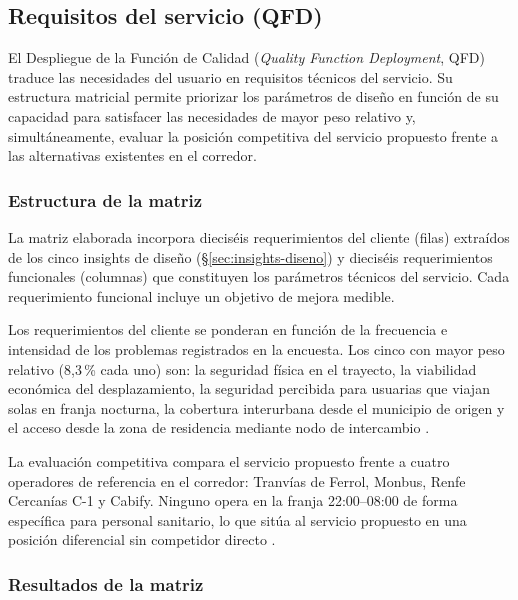 \subsection{Requisitos del servicio (QFD)}\label{sec:qfd}

El Despliegue de la Función de Calidad (\textit{Quality Function Deployment},
QFD) traduce las necesidades del usuario en requisitos técnicos del servicio.
Su estructura matricial permite priorizar los parámetros de diseño en función
de su capacidad para satisfacer las necesidades de mayor peso relativo y,
simultáneamente, evaluar la posición competitiva del servicio propuesto
frente a las alternativas existentes en el corredor.

\subsubsection{Estructura de la matriz}
\label{sec:qfd-estructura}

La matriz elaborada incorpora dieciséis requerimientos del cliente (filas)
extraídos de los cinco insights de diseño (§\ref{sec:insights-diseno}) y
dieciséis requerimientos funcionales (columnas) que constituyen los
parámetros técnicos del servicio. Cada requerimiento funcional incluye
un objetivo de mejora medible.

Los requerimientos del cliente se ponderan en función de la frecuencia e
intensidad de los problemas registrados en la encuesta. Los cinco con
mayor peso relativo (8,3\,\% cada uno) son: la seguridad física en el
trayecto, la viabilidad económica del desplazamiento, la seguridad percibida
para usuarias que viajan solas en franja nocturna, la cobertura interurbana
desde el municipio de origen y el acceso desde la zona de residencia mediante
nodo de intercambio \parencite{LouridoRegueira2026}.

La evaluación competitiva compara el servicio propuesto frente a cuatro
operadores de referencia en el corredor: Tranvías de Ferrol, Monbus,
Renfe Cercanías C-1 y Cabify. Ninguno opera en la franja 22:00--08:00
de forma específica para personal sanitario, lo que sitúa al servicio
propuesto en una posición diferencial sin competidor directo
\parencite{Alsaferrol2024horarios,RenfeCercaniasFerrol2026}.

\subsubsection{Resultados de la matriz}
\label{sec:qfd-resultados}

